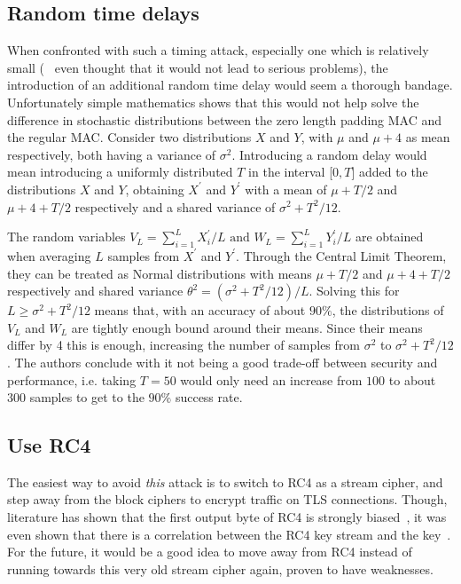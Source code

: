 \documentclass[10pt,conference,a4paper]{IEEEtran}
\begin{document}
\subsection{Random time delays}
\label{sec:future:random}
When confronted with such a timing attack, especially one which is relatively small (~\cite{ietf2008transport} even thought that it would not lead to serious problems), the introduction of an additional random time delay would seem a thorough bandage. Unfortunately simple mathematics shows that this would not help solve the difference in stochastic distributions between the zero length padding MAC and the regular MAC. Consider two distributions $X$ and $Y$, with $\mu$ and $\mu + 4$ as mean respectively, both having a variance of $\sigma^2$. Introducing a random delay would mean introducing a uniformly distributed $T$ in the interval [$0,T$] added to the distributions $X$ and $Y$, obtaining $X^{'}$ and $Y^{'}$ with a mean of $\mu + T/2$ and $\mu + 4 + T/2$ respectively and a shared variance of $\sigma^2 + T^2/12$.

The random variables $V_L = \sum_{i=1}^L X_i^{'}/L \text{ and } W_L = \sum_{i=1}^L Y_i^{'}/L$ are obtained when averaging $L$ samples from $X^{'}$ and $Y^{'}$. Through the Central Limit Theorem, they can be treated as Normal distributions with means $\mu + T/2$ and $\mu + 4 + T/2$ respectively and shared variance $\theta^2 = (\sigma^2 + T^2/12)/L$. Solving this for $L \geq \sigma^2 + T^2/12$ means that, with an accuracy of about $90\%$, the distributions of $V_L$ and $W_L$ are tightly enough bound around their means. Since their means differ by 4 this is enough, increasing the number of samples from $\sigma^2$ to $\sigma^2 + T^2/12$. The authors conclude with it not being a good trade-off between security and performance, i.e. taking $T = 50$ would only need an increase from $100$ to about $300$ samples to get to the $90\%$ success rate.

\subsection{Use RC4}
\label{sec:future:rc4}
The easiest way to avoid \textit{this} attack is to switch to RC4 as a stream cipher, and step away from the block ciphers to encrypt traffic on TLS connections. Though, literature has shown that the first output byte of RC4 is strongly biased~\cite{fluhrer2001weaknesses}, it was even shown that there is a correlation between the RC4 key stream and the key~\cite{klein2008attacks}. For the future, it would be a good idea to move away from RC4 instead of running towards this very old stream cipher again, proven to have weaknesses.
\end{document}
